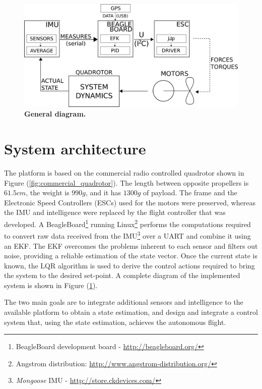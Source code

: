 \documentclass[conference]{IEEEtran}
\newcommand{\refp}[1]{(\ref{#1})}
\begin{document}
\begin{figure}[h!]
	\centering
	\hspace{10pt}\includegraphics[width=.8\columnwidth]{./pics_paper/diagrama_general.png}
	\caption{\textbf{General diagram.}}
	\label{fig:diagrama_tio}
\end{figure}

\section{System architecture}
The platform is based on the commercial radio controlled quadrotor shown in Figure \refp{fig:commercial_quadrotor}. The length between opposite propellers is $61.5cm$, the weight is $990g$, and it has $1300g$ of payload. The frame and the Electronic Speed Controllers (ESCs) used for the motors were preserved, whereas the IMU and intelligence were replaced by the flight controller that was developed. A BeagleBoard\footnote{BeagleBoard development board - \url{http://beagleboard.org/}} running Linux\footnote{Angstrom distribution: \url{http://www.angstrom-distribution.org/}} performs the computations required to convert raw data received from the IMU\footnote{\textit{Mongoose} IMU - \url{http://store.ckdevices.com/}} over a UART and combine it using an EKF. The EKF overcomes the problems inherent to each sensor and filters out noise, providing a reliable estimation of the state vector. Once the current state is known, the LQR algorithm is used to derive the control actions required to bring the system to the desired set-point. A complete diagram of the implemented system is shown in Figure \refp{fig:diagrama_tio}.

 
The two main goals are to integrate additional sensors and intelligence to the available platform to obtain a state estimation, and design and integrate a control system that, using the state estimation, achieves the autonomous flight.
\end{document}
